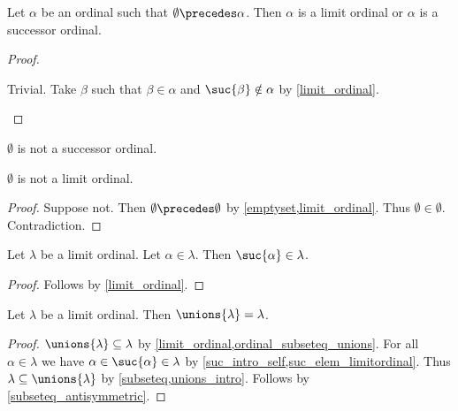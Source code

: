 \begin{lemma}\label{positive_ordinal_is_limit_or_successor}
    Let $\alpha$ be an ordinal such that $\emptyset\precedes\alpha$.
    Then $\alpha$ is a limit ordinal or $\alpha$ is a successor ordinal.
\end{lemma}
\begin{proof}
    \begin{byCase}
            Trivial.
            Take $\beta$ such that $\beta\in\alpha$ and $\suc{\beta}\notin\alpha$
                by \cref{limit_ordinal}.
    \end{byCase}
\end{proof}

\begin{lemma}\label{zero_not_successorordinal}
    $\emptyset$ is not a successor ordinal.
\end{lemma}

\begin{lemma}\label{zero_not_limitordinal}
    $\emptyset$ is not a limit ordinal.
\end{lemma}
\begin{proof}
    Suppose not.
    Then $\emptyset\precedes \emptyset$ by \cref{emptyset,limit_ordinal}.
    Thus $\emptyset\in \emptyset$.
    Contradiction.
\end{proof}

\begin{lemma}\label{suc_elem_limitordinal}
    Let $\lambda$ be a limit ordinal.
    Let $\alpha\in\lambda$.
    Then $\suc{\alpha}\in\lambda$.
\end{lemma}
\begin{proof}
    Follows by \cref{limit_ordinal}.
\end{proof}

\begin{lemma}\label{limitordinal_eq_unions}
    Let $\lambda$ be a limit ordinal.
    Then $\unions{\lambda} = \lambda$.
\end{lemma}
\begin{proof}
    $\unions{\lambda}\subseteq\lambda$ by \cref{limit_ordinal,ordinal_subseteq_unions}.
    For all $\alpha\in\lambda$ we have $\alpha\in\suc{\alpha}\in\lambda$ by \cref{suc_intro_self,suc_elem_limitordinal}.
    Thus $\lambda\subseteq\unions{\lambda}$ by \cref{subseteq,unions_intro}.
    Follows by \cref{subseteq_antisymmetric}.
\end{proof}


